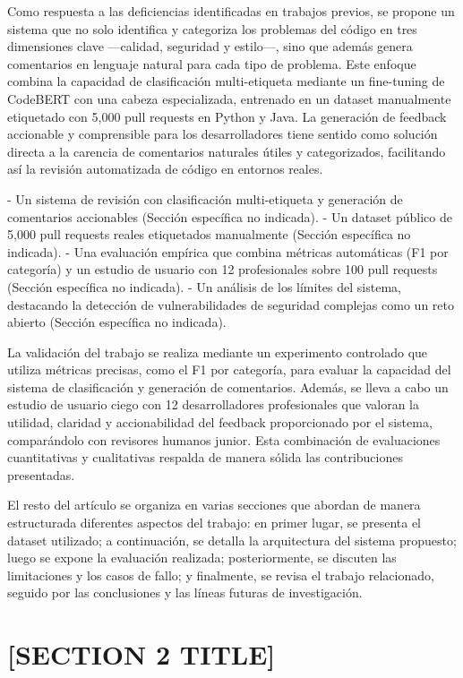 \documentclass[journal]{IEEEtran}
\begin{document}
Como respuesta a las deficiencias identificadas en trabajos previos, se propone un sistema que no solo identifica y categoriza los problemas del código en tres dimensiones clave —calidad, seguridad y estilo—, sino que además genera comentarios en lenguaje natural para cada tipo de problema. Este enfoque combina la capacidad de clasificación multi-etiqueta mediante un fine-tuning de CodeBERT con una cabeza especializada, entrenado en un dataset manualmente etiquetado con 5,000 pull requests en Python y Java. La generación de feedback accionable y comprensible para los desarrolladores tiene sentido como solución directa a la carencia de comentarios naturales útiles y categorizados, facilitando así la revisión automatizada de código en entornos reales.

- Un sistema de revisión con clasificación multi-etiqueta y generación de comentarios accionables (Sección específica no indicada).  
- Un dataset público de 5,000 pull requests reales etiquetados manualmente (Sección específica no indicada).  
- Una evaluación empírica que combina métricas automáticas (F1 por categoría) y un estudio de usuario con 12 profesionales sobre 100 pull requests (Sección específica no indicada).  
- Un análisis de los límites del sistema, destacando la detección de vulnerabilidades de seguridad complejas como un reto abierto (Sección específica no indicada).

La validación del trabajo se realiza mediante un experimento controlado que utiliza métricas precisas, como el F1 por categoría, para evaluar la capacidad del sistema de clasificación y generación de comentarios. Además, se lleva a cabo un estudio de usuario ciego con 12 desarrolladores profesionales que valoran la utilidad, claridad y accionabilidad del feedback proporcionado por el sistema, comparándolo con revisores humanos junior. Esta combinación de evaluaciones cuantitativas y cualitativas respalda de manera sólida las contribuciones presentadas.

El resto del artículo se organiza en varias secciones que abordan de manera estructurada diferentes aspectos del trabajo: en primer lugar, se presenta el dataset utilizado; a continuación, se detalla la arquitectura del sistema propuesto; luego se expone la evaluación realizada; posteriormente, se discuten las limitaciones y los casos de fallo; y finalmente, se revisa el trabajo relacionado, seguido por las conclusiones y las líneas futuras de investigación.


\section{[SECTION 2 TITLE]}
\label{sec:section2}
\end{document}
